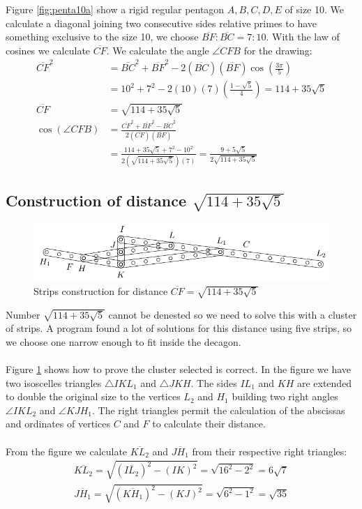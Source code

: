 \documentclass[11pt]{article}
\begin{document}
Figure \ref{fig:penta10a} show a rigid regular pentagon $A,B,C,D,E$ of size 10. We calculate a diagonal joining two consecutive sides relative primes to have something exclusive to the size 10, we choose $\overline{BF}:\overline{BC} = 7:10$. With the law of cosines we calculate $\overline{CF}$.
We calculate the angle $\angle{CFB}$ for the drawing:
\begin{align}
\overline{CF}^2 &= \overline{BC}^2 + \overline{BF}^2
 - 2(\overline{BC})(\overline{BF})\cos\left(\frac{3\pi}5\right)\nonumber\\
 &= 10^2 + 7^2 - 2(10)(7)\left(\frac{1-\sqrt5}4\right) = 114 + 35\sqrt5\\
\overline{CF} &= \sqrt{114 + 35\sqrt5} \\
\cos(\angle{CFB}) &= \frac{\overline{CF}^2 + \overline{BF}^2 - \overline{BC}^2}
 {2(\overline{CF})(\overline{BF})}\nonumber\\
 &= \frac{114+35\sqrt5 + 7^2 - 10^2}{2(\sqrt{114 + 35\sqrt5})(7)}
  = \frac{9+5\sqrt5}{2\sqrt{114+35\sqrt5}}
\end{align}

\subsection{Construction of distance $\sqrt{114+35\sqrt5}$}

\begin{figure}[h]
 \centering
 \includegraphics[scale=1.3]{10/cluster10a}
 \caption{Strips construction for distance $\overline{CF} = \sqrt{114+35\sqrt5}$}
 \label{fig:cluster10a}
\end{figure}

Number $\sqrt{114 + 35\sqrt5}$ cannot be denested so we need to solve this with a cluster of strips. A program found a lot of solutions for this distance using five strips, so we choose one narrow enough to fit inside the decagon.
\\\\
Figure \ref{fig:cluster10a} shows how to prove the cluster selected is correct. In the figure we have two isoscelles triangles $\triangle{IKL_1}$ and $\triangle{JKH}$. The sides $IL_1$ and $KH$ are extended to double the original size to the vertices $L_2$ and $H_1$ building two right angles $\angle{IKL_2}$ and $\angle{KJH_1}$. The right triangles permit the calculation of the abscissas and ordinates of vertices $C$ and $F$ to calculate their distance.
\\\\
From the figure we calculate $\overline{KL_2}$ and $\overline{JH_1}$ from their respective right triangles:
\begin{align}
\overline{KL_2} = \sqrt{(\overline{IL_2})^2 - (IK)^2} = \sqrt{16^2 - 2^2} = 6\sqrt7\\
\overline{JH_1} = \sqrt{(\overline{KH_1})^2 - (KJ)^2} = \sqrt{6^2 - 1^2} = \sqrt{35}
\end{align}
\end{document}
